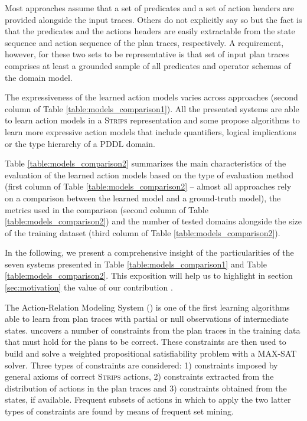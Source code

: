 
Most approaches assume that a set of predicates and a set of action headers are provided alongside the input traces. Others do not explicitly say so but the fact is that the predicates and the actions headers are easily extractable from the state sequence and action sequence of the plan traces, respectively. A requirement, however, for these two sets to be representative is that set of input plan traces comprises at least a grounded sample of all predicates and operator schemas of the domain model.

The expressiveness of the learned action models varies across approaches (second column of Table \ref{table:models_comparison1}). All the presented systems are able to learn action models in a \textsc{Strips}  representation \cite{fikes1971strips} and some propose algorithms to learn more expressive action models that include quantifiers, logical implications or the type hierarchy of a PDDL domain.

Table \ref{table:models_comparison2} summarizes the main characteristics of the evaluation of the learned action models based on the type of evaluation method (first column of Table \ref{table:models_comparison2} -- almost all approaches rely on a comparison between the learned model and a ground-truth model), the metrics used in the comparison (second column of Table \ref{table:models_comparison2}) and the number of tested domains alongside the size of the training dataset (third column of Table \ref{table:models_comparison2}).

In the following, we present a comprehensive insight of the particularities of the seven systems presented in Table \ref{table:models_comparison1} and Table \ref{table:models_comparison2}. This exposition will help us to highlight in section \ref{sec:motivation} the value of our contribution \FAMA.


\vspace{0.3cm}

The Action-Relation Modeling System (\textbf{\ARMS}) \cite{yang2007learning} is one of the first learning algorithms able to learn from plan traces with partial or null observations of intermediate states. \ARMS uncovers a number of constraints from the plan traces in the training data that must hold for the plans to be correct. These constraints are then used to build and solve a weighted propositional satisfiability problem with a MAX-SAT solver. Three types of constraints are considered: 1) constraints imposed by general axioms of correct \textsc{Strips} actions, 2) constraints extracted from the distribution of actions in the plan traces and 3) constraints obtained from the \PO states, if available. Frequent subsets of actions in which to apply the two latter types of constraints are found by means of frequent set mining.

